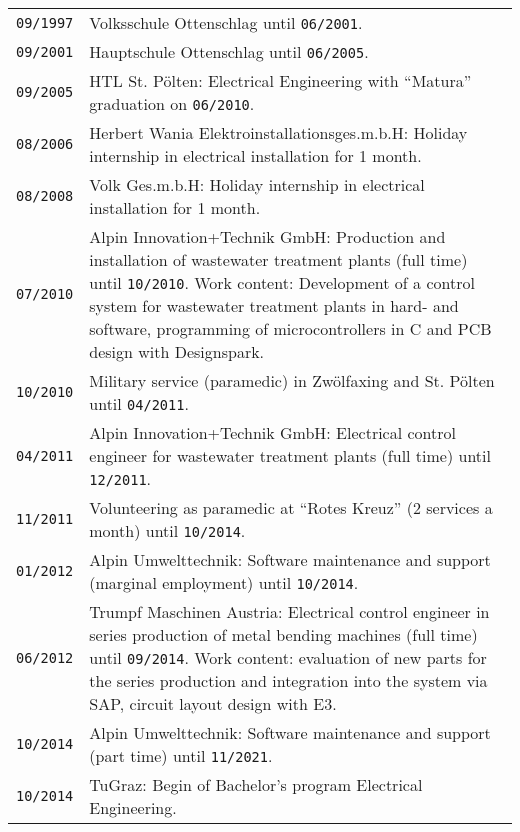 {
\vspace*{0.75cm}
\\\\
\begin{tabularx}{\columnwidth}{>{\centering\arraybackslash}p{1.5cm} | p{12cm}}
  \texttt{09/1997} & Volksschule Ottenschlag until \texttt{06/2001}.\\
  \texttt{09/2001} & Hauptschule Ottenschlag until \texttt{06/2005}.\\
  \texttt{09/2005} & HTL St. Pölten: Electrical Engineering with \enquote{Matura} graduation on \texttt{06/2010}.\\
  \texttt{08/2006} & Herbert Wania Elektroinstallationsges.m.b.H: Holiday internship in electrical installation for 1 month.\\
  \texttt{08/2008} & Volk Ges.m.b.H: Holiday internship in electrical installation for 1 month.\\
  \texttt{07/2010} & Alpin Innovation+Technik GmbH: Production and installation of wastewater treatment plants (full time) until \texttt{10/2010}. Work content: Development of a control system for wastewater treatment plants in hard- and software, programming of microcontrollers in C and PCB design with Designspark.\\
  \texttt{10/2010} & Military service (paramedic) in Zwölfaxing and St. Pölten until \texttt{04/2011}.\\
  \texttt{04/2011} & Alpin Innovation+Technik GmbH: Electrical control engineer for wastewater treatment plants (full time) until \texttt{12/2011}.\\
  \texttt{11/2011} & Volunteering as paramedic at \enquote{Rotes Kreuz} (2 services a month) until \texttt{10/2014}.\\
  \texttt{01/2012} & Alpin Umwelttechnik: Software maintenance and support (marginal employment) until \texttt{10/2014}.\\
  \texttt{06/2012} & Trumpf Maschinen Austria: Electrical control engineer in series production of metal bending machines (full time) until \texttt{09/2014}. Work content: evaluation of new parts for the series production and integration into the system via SAP, circuit layout design with E3.\\
  \texttt{10/2014} & Alpin Umwelttechnik: Software maintenance and support (part time) until \texttt{11/2021}.\\
  \texttt{10/2014} & TuGraz: Begin of Bachelor's program Electrical Engineering.\\

\end{tabularx}}
